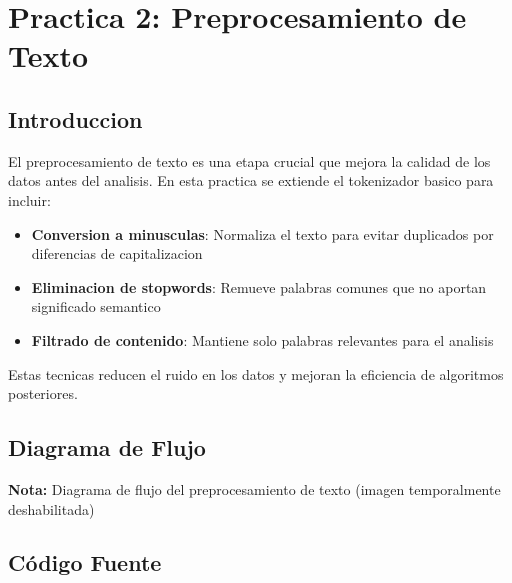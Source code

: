 \documentclass[12pt,a4paper]{article}
\begin{document}
\section{Practica 2: Preprocesamiento de Texto}

\subsection{Introduccion}

El preprocesamiento de texto es una etapa crucial que mejora la calidad de los datos antes del analisis. En esta practica se extiende el tokenizador basico para incluir:

\begin{itemize}
    \item \textbf{Conversion a minusculas}: Normaliza el texto para evitar duplicados por diferencias de capitalizacion
    \item \textbf{Eliminacion de stopwords}: Remueve palabras comunes que no aportan significado semantico
    \item \textbf{Filtrado de contenido}: Mantiene solo palabras relevantes para el analisis
\end{itemize}

Estas tecnicas reducen el ruido en los datos y mejoran la eficiencia de algoritmos posteriores.

\subsection{Diagrama de Flujo}


\textbf{Nota:} Diagrama de flujo del preprocesamiento de texto (imagen temporalmente deshabilitada)

\subsection{Código Fuente}
\end{document}
